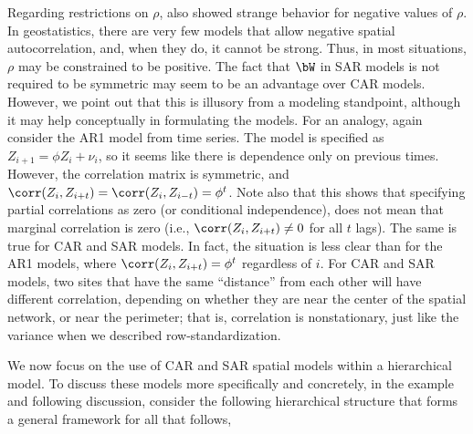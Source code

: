 Regarding restrictions on $\rho$, \citet{Wall:clos:2004} also showed strange behavior for negative values of $\rho$. In geostatistics, there are very few models that allow negative spatial autocorrelation, and, when they do, it cannot be strong. Thus, in most situations, $\rho$ may be constrained to be positive. The fact that $\bW$ in SAR models is not required to be symmetric may seem to be an advantage over CAR models.  However, we point out that this is illusory from a modeling standpoint, although it may help conceptually in formulating the models.  For an analogy, again consider the AR1 model from time series.  The model is specified as $Z_{i+1} = \phi Z_i + \nu_i$, so it seems like there is dependence only on previous times.  However, the correlation matrix is symmetric, and $\corr(Z_i, Z_{i + t}) = \corr(Z_i,Z_{i - t}) = \phi^t$.  Note also that this shows that specifying partial correlations as zero (or conditional independence), does not mean that marginal correlation is zero (i.e., $\corr(Z_i, Z_{i + t}) \neq 0$ for all $t$ lags).  The same is true for CAR and SAR models.  In fact, the situation is less clear than for the AR1 models, where $\corr(Z_i, Z_{i + t}) = \phi^t$ regardless of $i$.  For CAR and SAR models, two sites that have the same ``distance'' from each other will have different correlation, depending on whether they are near the center of the spatial network, or near the perimeter; that is, correlation is nonstationary, just like the variance when we described row-standardization.

We now focus on the use of CAR and SAR spatial models within a hierarchical model. To discuss these models more specifically and concretely, in the example and following discussion, consider the following hierarchical structure that forms a general framework for all that follows,

